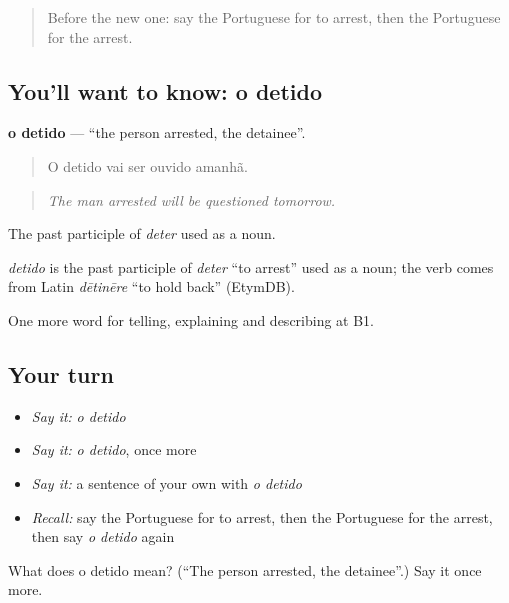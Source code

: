 \label{lesson:PT-C295-detido}



\begin{quote}
Before the new one: say the Portuguese for to arrest, then the Portuguese for the arrest.
\end{quote}

\subsection*{You'll want to know: o detido}
\textbf{o detido} — \textquotedblleft{}the person arrested, the detainee\textquotedblright{}.

\begin{quote}
O detido vai ser ouvido amanhã.
\end{quote}

\begin{quote}
\emph{The man arrested will be questioned tomorrow.}
\end{quote}

The past participle of \emph{deter} used as a noun.

\begin{cousinweb}
\emph{detido} is the past participle of \emph{deter} \textquotedblleft{}to arrest\textquotedblright{} used as a noun; the verb comes from Latin \emph{dētinēre} \textquotedblleft{}to hold back\textquotedblright{} (EtymDB).
\end{cousinweb}

\begin{grammarlens}[title={What you've built}]
One more word for telling, explaining and describing at B1.
\end{grammarlens}

\subsection*{Your turn}
\begin{itemize}
\raggedright
  \item \emph{Say it:} \emph{o detido}
  \item \emph{Say it:} \emph{o detido}, once more
  \item \emph{Say it:} a sentence of your own with \emph{o detido}
  \item \emph{Recall:} say the Portuguese for to arrest, then the Portuguese for the arrest, then say \emph{o detido} again
\end{itemize}

\begin{tcolorbox}[breakable,colback=teal!4,colframe=teal!35!black,title={Before you move on}]
What does o detido mean? (\textquotedblleft{}The person arrested, the detainee\textquotedblright{}.) Say it once more.
\end{tcolorbox}
